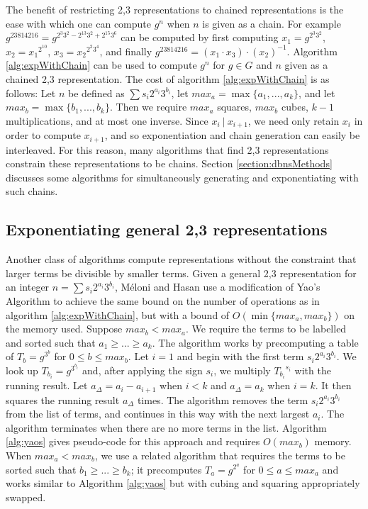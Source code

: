 \documentclass{ucalgthes1}
\theoremstyle{plain}
\theoremstyle{definition}
\begin{document}
The benefit of restricting 2,3 representations to chained representations is the ease with which one can compute $g^n$ when $n$ is given as a chain.  For example $g^{23814216} = g^{2^3 3^2 - 2^{13} 3^2 + 2^{15} 3^6}$ can be computed by first computing $x_1 = g^{2^3 3^2}$, $x_2 = {x_1}^{2^{10}}$, $x_3 = {x_2}^{2^2 3^4}$, and finally $g^{23814216} = \left(x_1 \cdot x_3\right) \cdot \left(x_2\right)^{-1}$.  Algorithm \ref{alg:expWithChain} can be used to compute $g^n$ for $g \in G$ and $n$ given as a chained 2,3 representation.  The cost of algorithm \ref{alg:expWithChain} is as follows: Let $n$ be defined as $\sum s_i 2^{a_i} 3^{b_i}$, let $max_a = \max \{a_1,...,a_k\}$, and let $max_b = \max \{b_1,...,b_k\}$.  Then we require $max_a$ squares, $max_b$ cubes, $k-1$ multiplications, and at most one inverse.  Since $x_i ~|~ x_{i+1}$, we need only retain $x_i$ in order to compute $x_{i+1}$, and so exponentiation and chain generation can easily be interleaved. For this reason, many algorithms that find 2,3 representations constrain these representations to be chains.  Section \ref{section:dbnsMethods} discusses some algorithms for simultaneously generating and exponentiating with such chains.



\bigbreak
\subsection{Exponentiating general 2,3 representations}

Another class of algorithms compute representations without the constraint that larger terms be divisible by smaller terms.  Given a general 2,3 representation for an integer $n = \sum s_i 2^{a_i} 3^{b_i}$, M\'{e}loni and Hasan \cite[Section 3.2]{Meloni2009} use a modification of Yao's Algorithm to achieve the same bound on the number of operations as in algorithm \ref{alg:expWithChain}, but with a bound of $O(\min \{max_a, max_b\})$ on the memory used.  Suppose $max_b < max_a$.  We require the terms to be labelled and sorted such that $a_1 \ge ... \ge a_k$.  The algorithm works by precomputing a table of $T_b = g^{3^b}$ for $0 \le b \le max_b$.  Let $i=1$ and begin with the first term $s_i2^{a_i}3^{b_i}$.  We look up $T_{b_i} = g^{3^{b_i}}$ and, after applying the sign $s_i$, we multiply ${T_{b_i}}^{s_i}$ with the running result.  Let $a_\Delta = a_i - a_{i+1}$ when $i < k$ and $a_\Delta = a_k$ when $i = k$.  It then squares the running result $a_\Delta$ times.  The algorithm removes the term $s_i2^{a_i}3^{b_i}$ from the list of terms, and continues in this way with the next largest $a_i$.  The algorithm terminates when there are no more terms in the list.  Algorithm  \ref{alg:yaos} gives pseudo-code for this approach and requires $O(max_b)$ memory.  When $max_a < max_b$, we use a related algorithm that requires the terms to be sorted such that $b_1 \ge ... \ge b_k$; it precomputes $T_a = g^{2^a}$ for $0 \le a \le max_a$ and works similar to Algorithm \ref{alg:yaos} but with cubing and squaring appropriately swapped.
\end{document}
